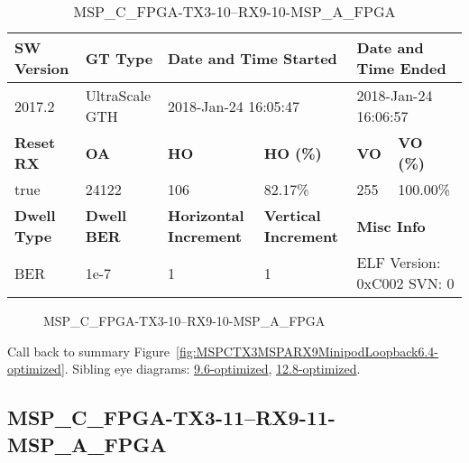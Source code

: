 \begin{table}[h]
\centering
\caption{MSP\_C\_FPGA-TX3-10--RX9-10-MSP\_A\_FPGA}
\label{tab:MSPCFPGATX310RX910MSPAFPGA6.4-optimized}
\begin{tabular}{@{}|l|l|l|l|l|l|@{}}
\toprule
\textbf{SW Version}                & \textbf{GT Type}   & \multicolumn{2}{l|}{\textbf{Date and Time Started}}            & \multicolumn{2}{l|}{\textbf{Date and Time Ended}}        \\ \midrule
2017.2                       & UltraScale GTH          & \multicolumn{2}{l|}{2018-Jan-24 16:05:47}                   & \multicolumn{2}{l|}{2018-Jan-24 16:06:57}               \\ \midrule
\textbf{Reset RX}                  & \textbf{OA} & \textbf{HO}   & \textbf{HO (\%)} & \textbf{VO} & \textbf{VO (\%)} \\ \midrule
true & 24122        & 106          & 82.17\%        & 255        & 100.00\%       \\ \midrule
\textbf{Dwell Type}                & \textbf{Dwell BER} & \textbf{Horizontal Increment} & \textbf{Vertical Increment}    & \multicolumn{2}{l|}{\textbf{Misc Info}}                  \\ \midrule
BER                            & 1e-7        & 1        & 1           & \multicolumn{2}{l|}{ELF Version: 0xC002 SVN: 0}                         \\ \bottomrule
\end{tabular}
\end{table}

\begin{figure}[h]
\caption{MSP\_C\_FPGA-TX3-10--RX9-10-MSP\_A\_FPGA} \label{fig:MSPCFPGATX310RX910MSPAFPGA6.4-optimized}
\end{figure}

Call back to summary Figure~\ref{fig:MSPCTX3MSPARX9MinipodLoopback6.4-optimized}.
Sibling eye diagrams: \hyperref[sec:MSPCFPGATX310RX910MSPAFPGA9.6-optimized]{9.6-optimized}, \hyperref[sec:MSPCFPGATX310RX910MSPAFPGA12.8-optimized]{12.8-optimized}.

\clearpage
\newpage


\subsection{MSP\_C\_FPGA-TX3-11--RX9-11-MSP\_A\_FPGA}\label{sec:MSPCFPGATX311RX911MSPAFPGA6.4-optimized}

